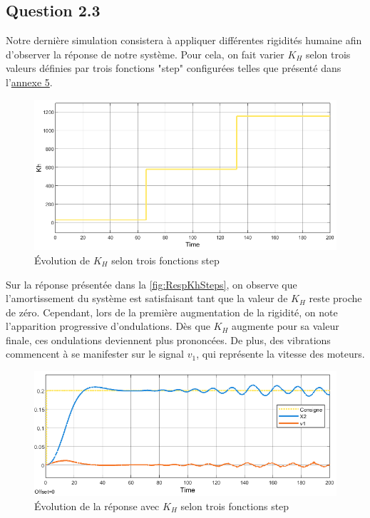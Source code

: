 \documentclass[a4paper,12pt]{article}
\begin{document}
    
    \subsection{Question 2.3}
    Notre dernière simulation consistera à appliquer différentes rigidités humaine afin d'observer la réponse de notre système. Pour cela, on fait varier $K_H$ selon trois valeurs définies par trois fonctions "step" configurées telles que présenté dans l'\hyperref[Annexe:modelHumain]{annexe 5}.
    \begin{figure}[H]
        \centering
        \includegraphics[width=15cm]{./img/Kh_Evolution_Steps.png}
        \caption{Évolution de $K_H$ selon trois fonctions step\label{fig:KhSteps}}
    \end{figure}

    Sur la réponse présentée dans la \autoref{fig:RespKhSteps}, on observe que l'amortissement du système est satisfaisant tant que la valeur de $K_H$ reste proche de zéro. Cependant, lors de la première augmentation de la rigidité, on note l'apparition progressive d'ondulations. Dès que $K_H$ augmente pour sa valeur finale, ces ondulations deviennent plus prononcées. De plus, des vibrations commencent à se manifester sur le signal $v_1$, qui représente la vitesse des moteurs.
    \begin{figure}[H]
        \centering
        \includegraphics[width=16cm]{./img/response_KhSteps.png}
        \caption{Évolution de la réponse avec $K_H$ selon trois fonctions step\label{fig:RespKhSteps}}
    \end{figure}
    
\end{document}
